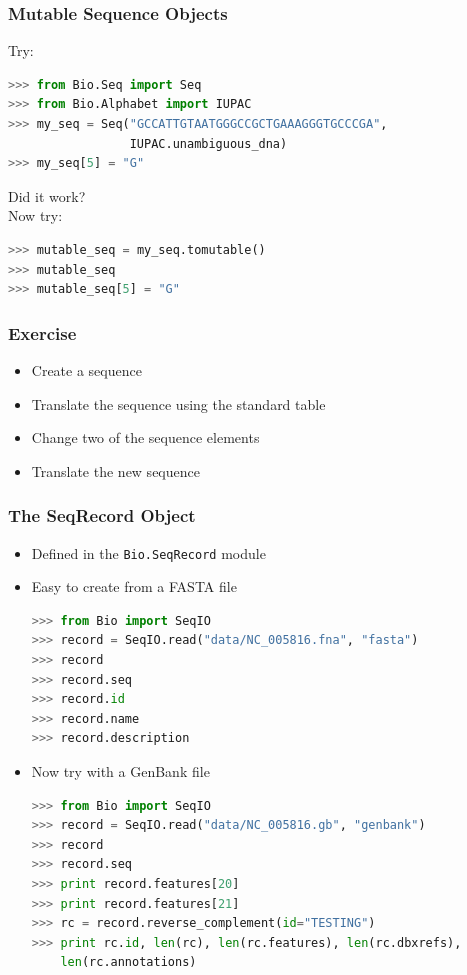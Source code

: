 \documentclass[xcolor=table,10pt,final]{beamer}
\begin{document}
\begin{frame}[fragile]
	\frametitle{Mutable Sequence Objects}
Try:
	\begin{lstlisting}[language=python]
>>> from Bio.Seq import Seq
>>> from Bio.Alphabet import IUPAC
>>> my_seq = Seq("GCCATTGTAATGGGCCGCTGAAAGGGTGCCCGA",
                 IUPAC.unambiguous_dna)
>>> my_seq[5] = "G"
	\end{lstlisting}
Did it work?\\
Now try:
	\begin{lstlisting}[language=python]
>>> mutable_seq = my_seq.tomutable()
>>> mutable_seq
>>> mutable_seq[5] = "G"
	\end{lstlisting}
\end{frame}


\begin{frame}[fragile]
	\frametitle{Exercise}
	\begin{itemize}
		\item Create a sequence
		\item Translate the sequence using the standard table
		\item Change two of the sequence elements
		\item Translate the new sequence
	\end{itemize}
\end{frame}


\begin{frame}[fragile]
	\frametitle{The SeqRecord Object}
	\begin{itemize}
		\item Defined in the \texttt{Bio.SeqRecord} module
		\item Easy to create from a FASTA file
		\begin{lstlisting}[language=python]
>>> from Bio import SeqIO
>>> record = SeqIO.read("data/NC_005816.fna", "fasta")
>>> record
>>> record.seq
>>> record.id
>>> record.name
>>> record.description
		\end{lstlisting}
		\item Now try with a GenBank file
		\begin{lstlisting}[language=python]
>>> from Bio import SeqIO
>>> record = SeqIO.read("data/NC_005816.gb", "genbank")
>>> record
>>> record.seq
>>> print record.features[20]
>>> print record.features[21]
>>> rc = record.reverse_complement(id="TESTING")
>>> print rc.id, len(rc), len(rc.features), len(rc.dbxrefs),
    len(rc.annotations)
		\end{lstlisting}
	\end{itemize}
\end{frame}
\end{document}
